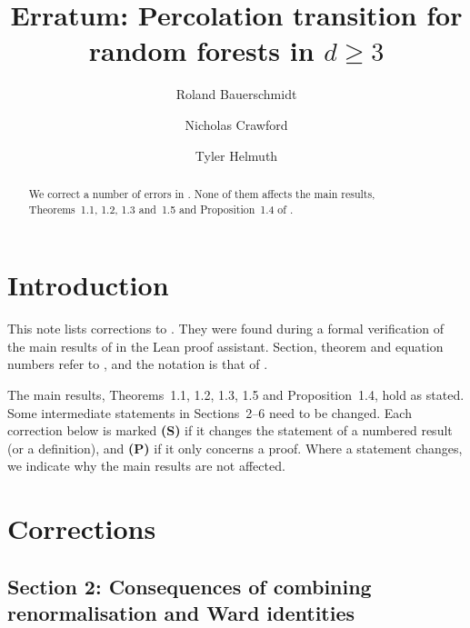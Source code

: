 \documentclass[11pt]{amsart}
\title{Erratum: Percolation transition for random forests in $d\geq 3$}
\date{}
\author{Roland Bauerschmidt}
\author{Nicholas Crawford}
\author{Tyler Helmuth}
\numberwithin{equation}{section}
\begin{document}
\sloppy

\begin{abstract}
  We correct a number of errors in \cite{BCH24}. None of them affects the main results,
  Theorems~1.1, 1.2, 1.3 and~1.5 and Proposition~1.4 of \cite{BCH24}.
\end{abstract}

\maketitle

\section{Introduction}

This note lists corrections to \cite{BCH24}. They were found during a formal verification of
the main results of \cite{BCH24} in the Lean proof assistant. Section, theorem and equation
numbers refer to \cite{BCH24}, and the notation is that of \cite{BCH24}.

The main results, Theorems~1.1, 1.2, 1.3, 1.5 and Proposition~1.4, hold as stated. Some
intermediate statements in Sections~2--6 need to be changed. Each correction below is marked
\textbf{(S)} if it changes the statement of a numbered result (or a definition), and
\textbf{(P)} if it only concerns a proof. Where a statement changes, we indicate why the main
results are not affected.

\section{Corrections}

\subsection*{Section 2: Consequences of combining renormalisation and Ward identities}
\end{document}
